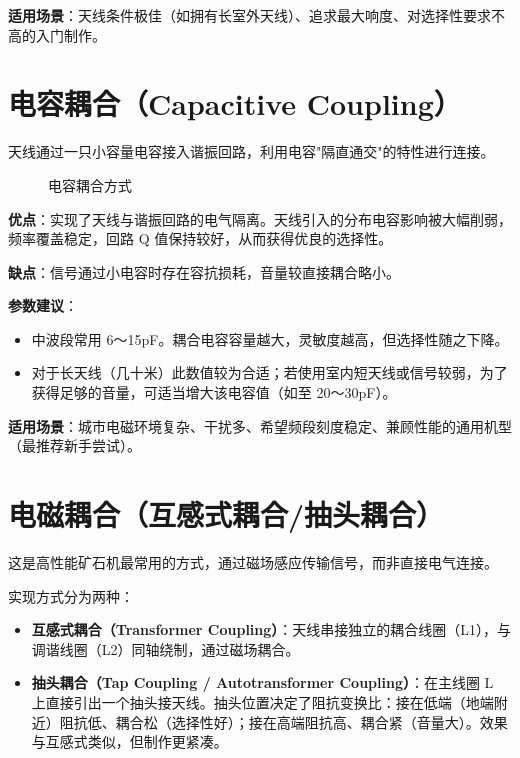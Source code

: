 \documentclass[12pt,UTF8]{ctexbook}
\begin{document}
\textbf{适用场景}：天线条件极佳（如拥有长室外天线）、追求最大响度、对选择性要求不高的入门制作。

\section{电容耦合（Capacitive Coupling）}

天线通过一只小容量电容接入谐振回路，利用电容"隔直通交"的特性进行连接。

\begin{figure}[H]
	\centering
	\caption{电容耦合方式}
	\label{fig:capacitive-coupling}
\end{figure}

\textbf{优点}：实现了天线与谐振回路的电气隔离。天线引入的分布电容影响被大幅削弱，频率覆盖稳定，回路 Q 值保持较好，从而获得优良的选择性。

\textbf{缺点}：信号通过小电容时存在容抗损耗，音量较直接耦合略小。

\textbf{参数建议}：

\begin{itemize}[leftmargin=2cm]
	\item 中波段常用 6～15pF。耦合电容容量越大，灵敏度越高，但选择性随之下降。
	\item 对于长天线（几十米）此数值较为合适；若使用室内短天线或信号较弱，为了获得足够的音量，可适当增大该电容值（如至 20～30pF）。
\end{itemize}

\textbf{适用场景}：城市电磁环境复杂、干扰多、希望频段刻度稳定、兼顾性能的通用机型（最推荐新手尝试）。

\section{电磁耦合（互感式耦合/抽头耦合）}

这是高性能矿石机最常用的方式，通过磁场感应传输信号，而非直接电气连接。

实现方式分为两种：

\begin{itemize}[leftmargin=2cm]
	\item \textbf{互感式耦合（Transformer Coupling）}：天线串接独立的耦合线圈（L1），与调谐线圈（L2）同轴绕制，通过磁场耦合。
	\item \textbf{抽头耦合（Tap Coupling / Autotransformer Coupling）}：在主线圈 L 上直接引出一个抽头接天线。抽头位置决定了阻抗变换比：接在低端（地端附近）阻抗低、耦合松（选择性好）；接在高端阻抗高、耦合紧（音量大）。效果与互感式类似，但制作更紧凑。
\end{itemize}
\end{document}
